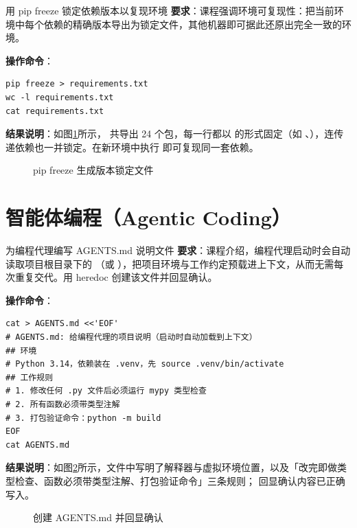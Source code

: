 \begin{exercise}{用 pip freeze 锁定依赖版本以复现环境}
\textbf{要求}：课程强调环境可复现性：把当前环境中每个依赖的精确版本导出为锁定文件，其他机器即可据此还原出完全一致的环境。

\textbf{操作命令}：
\begin{lstlisting}
pip freeze > requirements.txt
wc -l requirements.txt
cat requirements.txt
\end{lstlisting}

\textbf{结果说明}：如图\ref{fig:ms2-04}所示， 共导出 24 个包，每一行都以  的形式固定（如 、），连传递依赖也一并锁定。在新环境中执行  即可复现同一套依赖。

\begin{figure}[H]
    \centering
    \caption{pip freeze 生成版本锁定文件}
    \label{fig:ms2-04}
\end{figure}
\end{exercise}

\section{智能体编程（Agentic Coding）}

\begin{exercise}{为编程代理编写 AGENTS.md 说明文件}
\textbf{要求}：课程介绍，编程代理启动时会自动读取项目根目录下的 （或 ），把项目环境与工作约定预载进上下文，从而无需每次重复交代。用 heredoc 创建该文件并回显确认。

\textbf{操作命令}：
\begin{lstlisting}
cat > AGENTS.md <<'EOF'
# AGENTS.md: 给编程代理的项目说明（启动时自动加载到上下文）
## 环境
# Python 3.14，依赖装在 .venv，先 source .venv/bin/activate
## 工作规则
# 1. 修改任何 .py 文件后必须运行 mypy 类型检查
# 2. 所有函数必须带类型注解
# 3. 打包验证命令：python -m build
EOF
cat AGENTS.md
\end{lstlisting}

\textbf{结果说明}：如图\ref{fig:ms2-05}所示，文件中写明了解释器与虚拟环境位置，以及「改完即做类型检查、函数必须带类型注解、打包验证命令」三条规则； 回显确认内容已正确写入。

\begin{figure}[H]
    \centering
    \caption{创建 AGENTS.md 并回显确认}
    \label{fig:ms2-05}
\end{figure}
\end{exercise}

